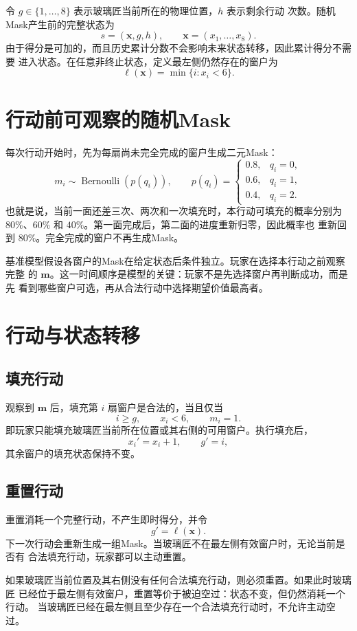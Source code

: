 \documentclass[UTF8,11pt,openany]{ctexrep}
\newcommand{\xvec}{\boldsymbol{x}}
\newcommand{\mvec}{\boldsymbol{m}}
\begin{document}
令 $g\in\{1,\ldots,8\}$ 表示玻璃匠当前所在的物理位置，$h$ 表示剩余行动
次数。随机Mask产生前的完整状态为
\[
s=(\xvec,g,h),\qquad \xvec=(x_1,\ldots,x_8).
\]
由于得分是可加的，而且历史累计分数不会影响未来状态转移，因此累计得分不需要
进入状态。在任意非终止状态，定义最左侧仍然存在的窗户为
\[
\ell(\xvec)=\min\{i:x_i<6\}.
\]

\section{行动前可观察的随机Mask}

每次行动开始时，先为每扇尚未完全完成的窗户生成二元Mask：
\[
m_i\sim\operatorname{Bernoulli}(p(q_i)),
\qquad
p(q_i)=
\begin{cases}
0.8, & q_i=0,\\
0.6, & q_i=1,\\
0.4, & q_i=2.
\end{cases}
\]
也就是说，当前一面还差三次、两次和一次填充时，本行动可填充的概率分别为
$80\%$、$60\%$ 和 $40\%$。第一面完成后，第二面的进度重新归零，因此概率也
重新回到 $80\%$。完全完成的窗户不再生成Mask。

基准模型假设各窗户的Mask在给定状态后条件独立。玩家在选择本行动之前观察完整
的 $\mvec$。这一时间顺序是模型的关键：玩家不是先选择窗户再判断成功，而是先
看到哪些窗户可选，再从合法行动中选择期望价值最高者。

\section{行动与状态转移}

\subsection{填充行动}

观察到 $\mvec$ 后，填充第 $i$ 扇窗户是合法的，当且仅当
\[
i\ge g,\qquad x_i<6,\qquad m_i=1.
\]
即玩家只能填充玻璃匠当前所在位置或其右侧的可用窗户。执行填充后，
\[
x_i'=x_i+1,\qquad g'=i,
\]
其余窗户的填充状态保持不变。

\subsection{重置行动}

重置消耗一个完整行动，不产生即时得分，并令
\[
g'=\ell(\xvec).
\]
下一次行动会重新生成一组Mask。当玻璃匠不在最左侧有效窗户时，无论当前是否有
合法填充行动，玩家都可以主动重置。

如果玻璃匠当前位置及其右侧没有任何合法填充行动，则必须重置。如果此时玻璃匠
已经位于最左侧有效窗户，重置等价于被迫空过：状态不变，但仍然消耗一个行动。
当玻璃匠已经在最左侧且至少存在一个合法填充行动时，不允许主动空过。
\end{document}
